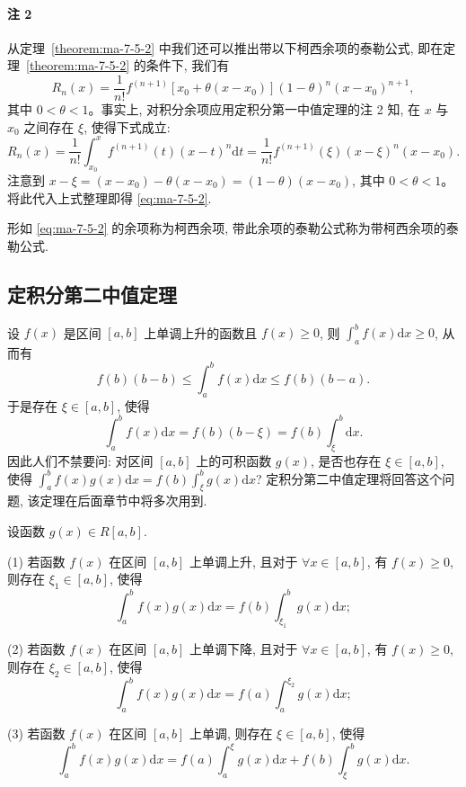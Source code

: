 \paragraph*{注 2}
从定理~\ref{theorem:ma-7-5-2} 中我们还可以推出带以下柯西余项的泰勒公式, 即在定理~\ref{theorem:ma-7-5-2} 的条件下, 我们有
\begin{equation}
  R_n(x)=\frac{1}{n!}f^{(n+1)}[x_0+\theta(x-x_0)](1-\theta)^n(x-x_0)^{n+1},
  \label{eq:ma-7-5-2}
\end{equation}
其中 $0<\theta<1$。事实上, 对积分余项应用定积分第一中值定理的注 2 知, 在 $x$ 与 $x_0$ 之间存在 $\xi$, 使得下式成立:
\[
  R_n(x)=\frac{1}{n!}\int_{x_0}^x f^{(n+1)}(t)(x-t)^n\mathrm dt
  =\frac{1}{n!}f^{(n+1)}(\xi)(x-\xi)^n(x-x_0).
\]
注意到 $x-\xi=(x-x_0)-\theta(x-x_0)=(1-\theta)(x-x_0)$, 其中 $0<\theta<1$。将此代入上式整理即得 \eqref{eq:ma-7-5-2}.

形如 \eqref{eq:ma-7-5-2} 的余项称为柯西余项, 带此余项的泰勒公式称为带柯西余项的泰勒公式.

\subsection{定积分第二中值定理}
\label{subsec:ma-7-5-2}

设 $f(x)$ 是区间 $[a,b]$ 上单调上升的函数且 $f(x)\geq0$, 则 $\int_a^b f(x)\mathrm dx\geq0$, 从而有
\[
  f(b)(b-b)\leq\int_a^b f(x)\mathrm dx\leq f(b)(b-a).
\]
于是存在 $\xi\in[a,b]$, 使得
\[
  \int_a^b f(x)\mathrm dx=f(b)(b-\xi)=f(b)\int_\xi^b\mathrm dx.
\]
因此人们不禁要问: 对区间 $[a,b]$ 上的可积函数 $g(x)$, 是否也存在 $\xi\in[a,b]$, 使得 $\int_a^b f(x)g(x)\mathrm dx=f(b)\int_\xi^b g(x)\mathrm dx$? 定积分第二中值定理将回答这个问题, 该定理在后面章节中将多次用到.

\begin{theorem}[{定积分第二中值定理}]\label{theorem:ma-7-5-3}
设函数 $g(x)\in R[a,b]$.

(1) 若函数 $f(x)$ 在区间 $[a,b]$ 上单调上升, 且对于 $\forall x\in[a,b]$, 有 $f(x)\geq0$, 则存在 $\xi_1\in[a,b]$, 使得
\[
  \int_a^b f(x)g(x)\mathrm dx=f(b)\int_{\xi_1}^b g(x)\mathrm dx;
\]

(2) 若函数 $f(x)$ 在区间 $[a,b]$ 上单调下降, 且对于 $\forall x\in[a,b]$, 有 $f(x)\geq0$, 则存在 $\xi_2\in[a,b]$, 使得
\[
  \int_a^b f(x)g(x)\mathrm dx=f(a)\int_a^{\xi_2} g(x)\mathrm dx;
\]

(3) 若函数 $f(x)$ 在区间 $[a,b]$ 上单调, 则存在 $\xi\in[a,b]$, 使得
\[
  \int_a^b f(x)g(x)\mathrm dx
  =f(a)\int_a^\xi g(x)\mathrm dx+f(b)\int_\xi^b g(x)\mathrm dx.
\]
\end{theorem}

